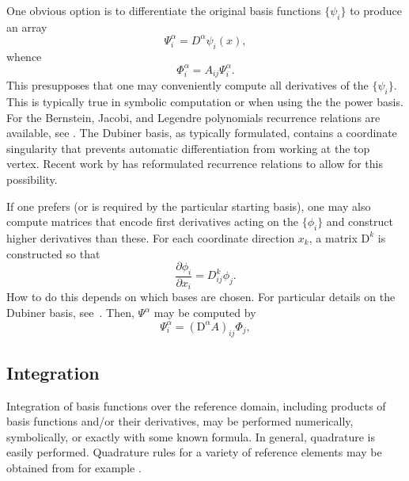 One obvious option is to differentiate the
original basis functions \( \{ \psi_i \} \) to produce an array
\[
\Psi^\alpha_i = D^\alpha \psi_i(x),
\]
whence
\[
\Phi^\alpha_i = A_{ij} \Psi^\alpha_i.
\]
This presupposes that one may conveniently compute all derivatives of
the \( \{ \psi_i \} \).  This is typically true in symbolic
computation or when using the the power basis.  
For the Bernstein, Jacobi, and Legendre
 polynomials recurrence relations are
available, see \citep{KarniadakisSherwin2005,Kirby2010}.  
The Dubiner basis, as typically formulated, contains a coordinate
singularity that prevents automatic differentiation from working at
the top vertex.  Recent work by \citet{Kirby} has reformulated recurrence
relations to allow for this possibility.

If one prefers (or is required by the particular starting basis), one
may also compute matrices that encode first derivatives acting on the
\( \{ \phi_i \} \) and construct higher derivatives than these.
For each coordinate direction \( x_k \), a matrix \( \mathrm{D}^k \)
is constructed so that
\[
\frac{\partial \phi_i}{\partial x_i} =
D^k_{ij} \phi_j.
\]
How to do this depends on which bases are chosen.  For particular
details on the Dubiner basis, see~\citep{Dubiner1991}.  Then, \( \Psi^\alpha \)
may be computed by
\[
\Psi^\alpha_i = (\mathrm{D}^\alpha A)_{ij} \Phi_{j},
\]

\subsection{Integration}
Integration of basis functions over the reference domain, including products of
basis functions and/or their derivatives, may be performed numerically,
symbolically, or exactly with some known formula. 
In general, quadrature is easily performed. 
Quadrature rules for a variety of reference elements may 
be obtained from for example \citep{Dunavant1985,KeeganRidzalBochev2008,SolinSegethDolevzel2004}.


